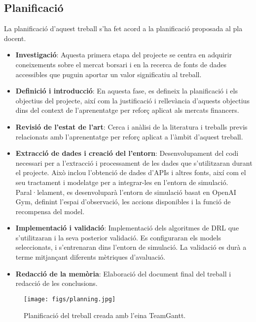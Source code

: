 \documentclass[12pt,a4paper,twoside]{book}
\begin{document}
\subsection{Planificació}
La planificació d'aquest treball s'ha fet acord a la planificació proposada al pla docent.
\begin{itemize}

    \item  \textbf{Investigació}: Aquesta primera etapa del projecte se centra en adquirir coneixements sobre el mercat borsari i en la recerca de fonts de dades accessibles que puguin aportar un valor significatiu al treball. 
    
    \item \textbf{Definició i introducció}: En aquesta fase, es defineix la planificació i els objectius del projecte, així com la justificació i rellevància d’aquests objectius dins del context de l’aprenentatge per reforç aplicat als mercats financers. 
    
    \item \textbf{Revisió de l'estat de l'art}: Cerca i anàlisi de la literatura i treballs previs relacionats amb l’aprenentatge per reforç aplicat a l'àmbit d'aquest treball.    
    \item \textbf{Extracció de dades i creació del l'entorn}: Desenvolupament del codi necessari per a l'extracció i processament de les dades que s'utilitzaran durant el projecte. Això inclou l’obtenció de dades d’APIs i altres fonts, així com el seu tractament i modelatge per a integrar-les en l'entorn de simulació. Paral·lelament, es desenvoluparà l'entorn de simulació basat en OpenAI Gym, definint l'espai d'observació, les accions disponibles i la funció de recompensa del model.
    
    \item \textbf{Implementació i validació}: Implementació dels algoritmes de DRL que s'utilitzaran i la seva posterior validació. Es configuraran els models seleccionats, i s'entrenaran dins l'entorn de simulació. La validació es durà a terme mitjançant diferents mètriques d'avaluació.
    
    \item \textbf{Redacció de la memòria}: Elaboració del document final del treball i redacció de les conclusions.
    
\end{itemize}

\begin{figure}[H]
	\centering
	\texttt{[image: figs/planning.jpg]}
	\caption{Planificació del treball creada amb l'eina TeamGantt\cite{TeamGantt}.}
	\label{fig:context-anoni1}
\end{figure}
\end{document}
